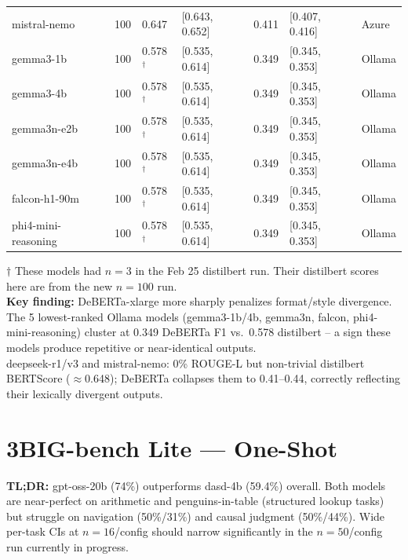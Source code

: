 \documentclass[11pt,letterpaper]{article}
\begin{document}
\begin{table}[h!]
\begin{tabular}{l R{0.7cm} R{1.5cm} R{2.6cm} R{1.5cm} R{2.6cm} l}
 mistral-nemo         & 100 & 0.647 & [0.643, 0.652] & 0.411 & [0.407, 0.416] & Azure \\
 gemma3-1b            & 100 & 0.578$^{\dagger}$ & [0.535, 0.614] & 0.349 & [0.345, 0.353] & Ollama \\
 gemma3-4b            & 100 & 0.578$^{\dagger}$ & [0.535, 0.614] & 0.349 & [0.345, 0.353] & Ollama \\
 gemma3n-e2b          & 100 & 0.578$^{\dagger}$ & [0.535, 0.614] & 0.349 & [0.345, 0.353] & Ollama \\
 gemma3n-e4b          & 100 & 0.578$^{\dagger}$ & [0.535, 0.614] & 0.349 & [0.345, 0.353] & Ollama \\
 falcon-h1-90m        & 100 & 0.578$^{\dagger}$ & [0.535, 0.614] & 0.349 & [0.345, 0.353] & Ollama \\
 phi4-mini-reasoning  & 100 & 0.578$^{\dagger}$ & [0.535, 0.614] & 0.349 & [0.345, 0.353] & Ollama \\
\bottomrule
\end{tabular}

\vspace{4pt}
{\footnotesize\textcolor{notegray}{$\dagger$ These models had $n=3$ in the Feb 25 distilbert run. Their distilbert scores here are from the new $n=100$ run.\\
\textbf{Key finding:} DeBERTa-xlarge more sharply penalizes format/style divergence. The 5 lowest-ranked Ollama models (gemma3-1b/4b, gemma3n, falcon, phi4-mini-reasoning) cluster at 0.349 DeBERTa F1 vs.\ 0.578 distilbert -- a sign these models produce repetitive or near-identical outputs.\\
deepseek-r1/v3 and mistral-nemo: 0\% ROUGE-L but non-trivial distilbert BERTScore ($\approx$0.648); DeBERTa collapses them to 0.41--0.44, correctly reflecting their lexically divergent outputs.}}
\end{table}

\newpage

\section*{3\quad BIG-bench Lite --- One-Shot}

\noindent\textbf{TL;DR:} gpt-oss-20b (74\%) outperforms dasd-4b (59.4\%) overall. Both models are near-perfect on arithmetic and penguins-in-table (structured lookup tasks) but struggle on navigation (50\%/31\%) and causal judgment (50\%/44\%). Wide per-task CIs at $n=16$/config should narrow significantly in the $n=50$/config run currently in progress.
\end{document}
